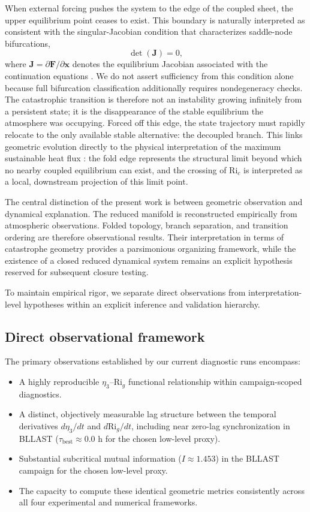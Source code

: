 \documentclass[12pt,a4paper]{article}
\newcommand{\Ric}{\mathrm{Ri}_c}
\newcommand{\Rig}{\mathrm{Ri}_g}
\newcommand{\vect}[1]{\mathbf{#1}}
\newcommand{\mat}[1]{\mathbf{#1}}
\begin{document}
When external forcing pushes the system to the edge of the coupled sheet, the upper equilibrium point ceases to exist. This boundary is naturally interpreted as consistent with the singular-Jacobian condition that characterizes saddle-node bifurcations,
\begin{equation}
\det(\mat{J}) = 0,
\end{equation}
where $\mat{J}=\partial \vect{F}/\partial \vect{x}$ denotes the equilibrium Jacobian associated with the continuation equations \citep{derbyshire1999}. We do not assert sufficiency from this condition alone because full bifurcation classification additionally requires nondegeneracy checks. The catastrophic transition is therefore not an instability growing infinitely from a persistent state; it is the disappearance of the stable equilibrium the atmosphere was occupying. Forced off this edge, the state trajectory must rapidly relocate to the only available stable alternative: the decoupled branch. This links geometric evolution directly to the physical interpretation of the maximum sustainable heat flux \citep{vandewiel2017, vignon2017}: the fold edge represents the structural limit beyond which no nearby coupled equilibrium can exist, and the crossing of $\Ric$ is interpreted as a local, downstream projection of this limit point.

The central distinction of the present work is between geometric observation and dynamical explanation. The reduced manifold is reconstructed empirically from atmospheric observations. Folded topology, branch separation, and transition ordering are therefore observational results. Their interpretation in terms of catastrophe geometry provides a parsimonious organizing framework, while the existence of a closed reduced dynamical system remains an explicit hypothesis reserved for subsequent closure testing.

To maintain empirical rigor, we separate direct observations from interpretation-level hypotheses within an explicit inference and validation hierarchy.

\subsection{Direct observational framework}

The primary observations established by our current diagnostic runs encompass:
\begin{itemize}
  \item A highly reproducible $\eta_3\text{--}\Rig$ functional relationship within campaign-scoped diagnostics.
  \item A distinct, objectively measurable lag structure between the temporal derivatives $d\eta_3/dt$ and $d\Rig/dt$, including near zero-lag synchronization in BLLAST ($\tau_{\text{best}} \approx 0.0\text{~h}$ for the chosen low-level proxy).
  \item Substantial subcritical mutual information ($I \approx 1.453$) in the BLLAST campaign for the chosen low-level proxy.
  \item The capacity to compute these identical geometric metrics consistently across all four experimental and numerical frameworks.
\end{itemize}
\end{document}
